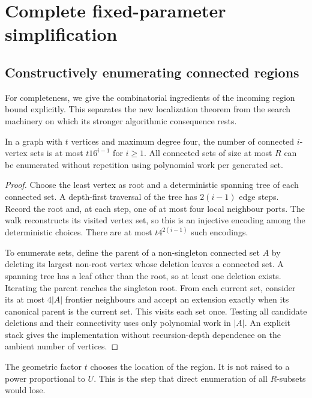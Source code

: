 \section{Complete fixed-parameter simplification}\label{sec:complexity}

\subsection{Constructively enumerating connected regions}

For completeness, we give the combinatorial ingredients of the incoming
region bound explicitly. This separates the new localization theorem from
the search machinery on which its stronger algorithmic consequence rests.

\begin{lemma}\label{lem:regions}
In a graph with $t$ vertices and maximum degree four, the number of connected
$i$-vertex sets is at most $t16^{i-1}$ for $i\ge1$. All connected sets of
size at most $R$ can be enumerated without repetition using polynomial work
per generated set.
\end{lemma}
\begin{proof}
Choose the least vertex as root and a deterministic spanning tree of each
connected set. A depth-first traversal of the tree has $2(i-1)$ edge steps.
Record the root and, at each step, one of at most four local neighbour ports.
The walk reconstructs its visited vertex set, so this is an injective
encoding among the deterministic choices. There are at most
$t4^{2(i-1)}$ such encodings.

To enumerate sets, define the parent of a non-singleton connected set $A$
by deleting its largest non-root vertex whose deletion leaves a connected
set. A spanning tree has a leaf other than the root, so at least one deletion
exists. Iterating the parent reaches the singleton root. From each current
set, consider its at most $4|A|$ frontier neighbours and accept an extension
exactly when its canonical parent is the current set. This visits each set
once. Testing all candidate deletions and their connectivity uses only
polynomial work in $|A|$. An explicit stack gives the implementation without
recursion-depth dependence on the ambient number of vertices.
\end{proof}

The geometric factor $t$ chooses the location of the region. It is not
raised to a power proportional to $U$. This is the step that direct
enumeration of all $R$-subsets would lose.

